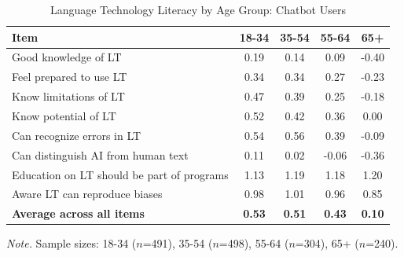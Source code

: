 \begin{table}[htbp]
\centering
\caption{Language Technology Literacy by Age Group: Chatbot Users}
\label{tab:users_by_age}
\begin{tabular}{lcccc}
\toprule
\textbf{Item} & \textbf{18-34} & \textbf{35-54} & \textbf{55-64} & \textbf{65+} \\
\midrule
Good knowledge of LT & 0.19 & 0.14 & 0.09 & -0.40 \\
Feel prepared to use LT & 0.34 & 0.34 & 0.27 & -0.23 \\
Know limitations of LT & 0.47 & 0.39 & 0.25 & -0.18 \\
Know potential of LT & 0.52 & 0.42 & 0.36 & 0.00 \\
Can recognize errors in LT & 0.54 & 0.56 & 0.39 & -0.09 \\
Can distinguish AI from human text & 0.11 & 0.02 & -0.06 & -0.36 \\
Education on LT should be part of programs & 1.13 & 1.19 & 1.18 & 1.20 \\
Aware LT can reproduce biases & 0.98 & 1.01 & 0.96 & 0.85 \\
\midrule
\textbf{Average across all items} & \textbf{0.53} & \textbf{0.51} & \textbf{0.43} & \textbf{0.10} \\
\bottomrule
\end{tabular}
\begin{tablenotes}
\small
\textit{Note.} Sample sizes: 18-34 ($n$=491), 35-54 ($n$=498), 55-64 ($n$=304), 65+ ($n$=240).
\end{tablenotes}
\end{table}